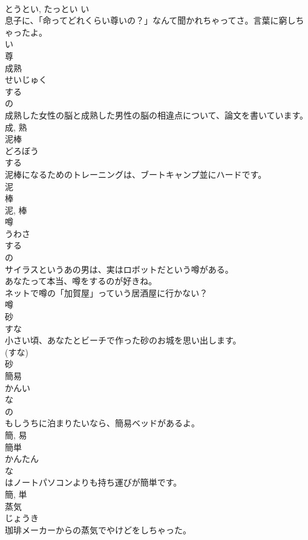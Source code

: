 \documentclass[8pt]{extreport}
\begin{document}
\begin{CJK}{UTF8}{min}
\\	とうとい, たっとい	い 
\\	息子に、「命ってどれくらい尊いの？」なんて聞かれちゃってさ。言葉に窮しちゃったよ。	
\\	い 
\\	尊	
\\	成熟	
\\	せいじゅく	
\\	する 
\\	の 
\\	成熟した女性の脳と成熟した男性の脳の相違点について、論文を書いています。	
\\	成, 熟	
\\	泥棒	
\\	どろぼう	
\\	する 
\\	泥棒になるためのトレーニングは、ブートキャンプ並にハードです。	
\\	泥 
\\	棒 
\\	泥, 棒	
\\	噂	
\\	うわさ	
\\	する 
\\	の 
\\	サイラスというあの男は、実はロボットだという噂がある。	
\\	あなたって本当、噂をするのが好きね。	
\\	ネットで噂の「加賀屋」っていう居酒屋に行かない？	
\\	噂	
\\	砂	
\\	すな	
\\	小さい頃、あなたとビーチで作った砂のお城を思い出します。	
\\	(すな) 
\\	砂	
\\	簡易	
\\	かんい	
\\	な 
\\	の 
\\	もしうちに泊まりたいなら、簡易ベッドがあるよ。	
\\	簡, 易	
\\	簡単	
\\	かんたん	
\\	な 
\\	はノートパソコンよりも持ち運びが簡単です。	
\\	簡, 単	
\\	蒸気	
\\	じょうき	
\\	珈琲メーカーからの蒸気でやけどをしちゃった。	

\end{CJK}
\end{document}
